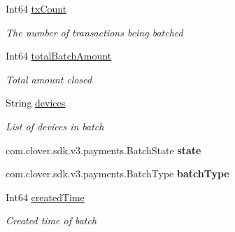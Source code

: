 \begin{DoxyCompactItemize}
Int64 \hyperlink{classcom_1_1clover_1_1sdk_1_1v3_1_1payments_1_1_batch_a787364af27ddf1d31e92a4c1b47c9fad}{tx\+Count}
\begin{DoxyCompactList}\small\item\em The number of transactions being batched \end{DoxyCompactList}\item 
Int64 \hyperlink{classcom_1_1clover_1_1sdk_1_1v3_1_1payments_1_1_batch_a9e47c2f64ca733efdddef7c6071e30dc}{total\+Batch\+Amount}
\begin{DoxyCompactList}\small\item\em Total amount closed \end{DoxyCompactList}\item 
String \hyperlink{classcom_1_1clover_1_1sdk_1_1v3_1_1payments_1_1_batch_a6b6b34ecc7474d320e8e9aee4e12686f}{devices}
\begin{DoxyCompactList}\small\item\em List of devices in batch \end{DoxyCompactList}\item 
\mbox{\label{classcom_1_1clover_1_1sdk_1_1v3_1_1payments_1_1_batch_ad48da987bf8578c360dcb871ad8e7bb2}} 
com.\+clover.\+sdk.\+v3.\+payments.\+Batch\+State {\bfseries state}
\item 
\mbox{\label{classcom_1_1clover_1_1sdk_1_1v3_1_1payments_1_1_batch_a4711c53b9ea807ccad577a3e91a96d76}} 
com.\+clover.\+sdk.\+v3.\+payments.\+Batch\+Type {\bfseries batch\+Type}
\item 
Int64 \hyperlink{classcom_1_1clover_1_1sdk_1_1v3_1_1payments_1_1_batch_ad373165fdf9082ad913cae5ff2bb7ffe}{created\+Time}
\begin{DoxyCompactList}\small\item\em Created time of batch \end{DoxyCompactList}\item 

\end{DoxyCompactItemize}
